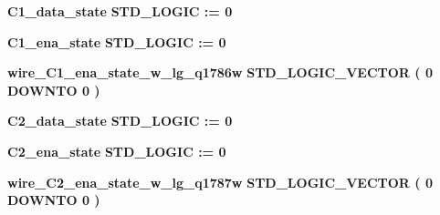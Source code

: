 \begin{DoxyCompactItemize}
\item 
{\bf C1\+\_\+data\+\_\+state} {\bfseries \textcolor{comment}{S\+T\+D\+\_\+\+L\+O\+G\+IC}\textcolor{vhdlchar}{ }\textcolor{vhdlchar}{ }\textcolor{vhdlchar}{\+:}\textcolor{vhdlchar}{=}\textcolor{vhdlchar}{ }\textcolor{vhdlchar}{ }\textcolor{vhdlchar}{\textquotesingle{}}\textcolor{vhdlchar}{ } \textcolor{vhdldigit}{0} \textcolor{vhdlchar}{ }\textcolor{vhdlchar}{\textquotesingle{}}\textcolor{vhdlchar}{ }} 
\item 
{\bf C1\+\_\+ena\+\_\+state} {\bfseries \textcolor{comment}{S\+T\+D\+\_\+\+L\+O\+G\+IC}\textcolor{vhdlchar}{ }\textcolor{vhdlchar}{ }\textcolor{vhdlchar}{\+:}\textcolor{vhdlchar}{=}\textcolor{vhdlchar}{ }\textcolor{vhdlchar}{ }\textcolor{vhdlchar}{\textquotesingle{}}\textcolor{vhdlchar}{ } \textcolor{vhdldigit}{0} \textcolor{vhdlchar}{ }\textcolor{vhdlchar}{\textquotesingle{}}\textcolor{vhdlchar}{ }} 
\item 
{\bf wire\+\_\+\+C1\+\_\+ena\+\_\+state\+\_\+w\+\_\+lg\+\_\+q1786w} {\bfseries \textcolor{comment}{S\+T\+D\+\_\+\+L\+O\+G\+I\+C\+\_\+\+V\+E\+C\+T\+OR}\textcolor{vhdlchar}{ }\textcolor{vhdlchar}{(}\textcolor{vhdlchar}{ }\textcolor{vhdlchar}{ } \textcolor{vhdldigit}{0} \textcolor{vhdlchar}{ }\textcolor{keywordflow}{D\+O\+W\+N\+TO}\textcolor{vhdlchar}{ }\textcolor{vhdlchar}{ } \textcolor{vhdldigit}{0} \textcolor{vhdlchar}{ }\textcolor{vhdlchar}{)}\textcolor{vhdlchar}{ }} 
\item 
{\bf C2\+\_\+data\+\_\+state} {\bfseries \textcolor{comment}{S\+T\+D\+\_\+\+L\+O\+G\+IC}\textcolor{vhdlchar}{ }\textcolor{vhdlchar}{ }\textcolor{vhdlchar}{\+:}\textcolor{vhdlchar}{=}\textcolor{vhdlchar}{ }\textcolor{vhdlchar}{ }\textcolor{vhdlchar}{\textquotesingle{}}\textcolor{vhdlchar}{ } \textcolor{vhdldigit}{0} \textcolor{vhdlchar}{ }\textcolor{vhdlchar}{\textquotesingle{}}\textcolor{vhdlchar}{ }} 
\item 
{\bf C2\+\_\+ena\+\_\+state} {\bfseries \textcolor{comment}{S\+T\+D\+\_\+\+L\+O\+G\+IC}\textcolor{vhdlchar}{ }\textcolor{vhdlchar}{ }\textcolor{vhdlchar}{\+:}\textcolor{vhdlchar}{=}\textcolor{vhdlchar}{ }\textcolor{vhdlchar}{ }\textcolor{vhdlchar}{\textquotesingle{}}\textcolor{vhdlchar}{ } \textcolor{vhdldigit}{0} \textcolor{vhdlchar}{ }\textcolor{vhdlchar}{\textquotesingle{}}\textcolor{vhdlchar}{ }} 
\item 
{\bf wire\+\_\+\+C2\+\_\+ena\+\_\+state\+\_\+w\+\_\+lg\+\_\+q1787w} {\bfseries \textcolor{comment}{S\+T\+D\+\_\+\+L\+O\+G\+I\+C\+\_\+\+V\+E\+C\+T\+OR}\textcolor{vhdlchar}{ }\textcolor{vhdlchar}{(}\textcolor{vhdlchar}{ }\textcolor{vhdlchar}{ } \textcolor{vhdldigit}{0} \textcolor{vhdlchar}{ }\textcolor{keywordflow}{D\+O\+W\+N\+TO}\textcolor{vhdlchar}{ }\textcolor{vhdlchar}{ } \textcolor{vhdldigit}{0} \textcolor{vhdlchar}{ }\textcolor{vhdlchar}{)}\textcolor{vhdlchar}{ }} 

\end{DoxyCompactItemize}
